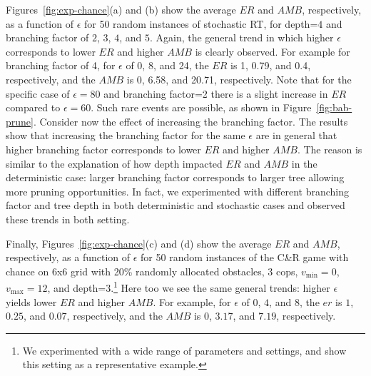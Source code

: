 \documentclass[runningheads]{llncs}
\newcommand{\vmax}{v_{\text{max}}}
\newcommand{\vmin}{v_{\text{min}}}
\newcommand{\amb}{\mathit{AMB}}
\newcommand{\er}{\mathit{ER}}
\begin{document}
Figures~\ref{fig:exp-chance}(a) and (b) show the average $\er$ and $\amb$, respectively, as a function of $\epsilon$ for 50 random instances of stochastic RT, for depth=$4$ and branching factor of $2$, $3$, $4$, and $5$. Again, the general trend in which higher $\epsilon$ corresponds to lower $\er$ and higher $\amb$ is clearly observed. For example for branching factor of 4, for $\epsilon$ of 0, 8, and 24, the $\er$ is 1, 0.79, and 0.4, respectively, and the $\amb$ is 0, 6.58, and 20.71, respectively.
Note that for the specific case of $\epsilon=80$ and branching factor=2 there is a slight increase in $\er$ compared to $\epsilon=60$. Such rare events are possible, as shown in Figure~\ref{fig:bab-prune}. 
Consider now the effect of increasing the branching factor. The results show that increasing the branching factor for the same $\epsilon$ are in general that higher branching factor corresponds to lower $\er$ and higher $\amb$. The reason is similar to the explanation of how depth impacted $\er$ and $\amb$ in the deterministic case: larger branching factor corresponds to larger tree allowing more pruning opportunities. 
In fact, we experimented with different branching factor and tree depth in both deterministic and stochastic cases and observed these trends in both setting. 

Finally, Figures~\ref{fig:exp-chance}(c) and (d) show the average $\er$ and $\amb$, respectively, as a function of $\epsilon$ for 50 random instances of the C\&R game with chance on 6x6 grid with 20\% randomly allocated obstacles, 3 cops, $\vmin=0$, $\vmax=12$, and depth=$3$.\footnote{We experimented with a wide range of parameters and settings, and show this setting as a representative example.} Here too we see the same general trends: higher $\epsilon$ yields lower $\er$ and higher $\amb$. For example, for $\epsilon$ of $0$, $4$, and $8$, the $er$ is $1$, $0.25$, and $0.07$, respectively, and the $\amb$ is $0$, $3.17$, and $7.19$, respectively.
\end{document}

